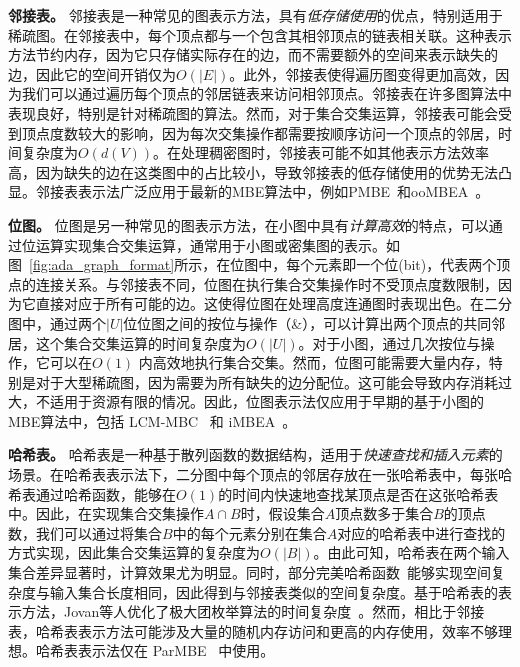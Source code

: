 \textbf{邻接表。} 邻接表是一种常见的图表示方法，具有\emph{低存储使用}的优点，特别适用于稀疏图。在邻接表中，每个顶点都与一个包含其相邻顶点的链表相关联。这种表示方法节约内存，因为它只存储实际存在的边，而不需要额外的空间来表示缺失的边，因此它的空间开销仅为$O(|E|)$。此外，邻接表使得遍历图变得更加高效，因为我们可以通过遍历每个顶点的邻居链表来访问相邻顶点。邻接表在许多图算法中表现良好，特别是针对稀疏图的算法。然而，对于集合交集运算，邻接表可能会受到顶点度数较大的影响，因为每次交集操作都需要按顺序访问一个顶点的邻居，时间复杂度为$O(d(V))$。在处理稠密图时，邻接表可能不如其他表示方法效率高，因为缺失的边在这类图中的占比较小，导致邻接表的低存储使用的优势无法凸显。邻接表表示法广泛应用于最新的MBE算法中，例如PMBE~\cite{PMBE20}和ooMBEA~\cite{ooMBE22}。

\textbf{位图。} 位图是另一种常见的图表示方法，在小图中具有\emph{计算高效}的特点，可以通过位运算实现集合交集运算，通常用于小图或密集图的表示。如图~\ref{fig:ada_graph_format}所示，在位图中，每个元素即一个位(bit)，代表两个顶点的连接关系。与邻接表不同，位图在执行集合交集操作时不受顶点度数限制，因为它直接对应于所有可能的边。这使得位图在处理高度连通图时表现出色。在二分图中，通过两个$|U|$位位图之间的按位与操作（\&），可以计算出两个顶点的共同邻居，这个集合交集运算的时间复杂度为$O(|U|)$。对于小图，通过几次按位与操作，它可以在$O(1)$ 内高效地执行集合交集。然而，位图可能需要大量内存，特别是对于大型稀疏图，因为需要为所有缺失的边分配位。这可能会导致内存消耗过大，不适用于资源有限的情况。因此，位图表示法仅应用于早期的基于小图的MBE算法中，包括 LCM-MBC~\cite{lcmmbc07} 和 iMBEA~\cite{iMBEA14}。

\textbf{哈希表。} 哈希表是一种基于散列函数的数据结构，适用于\emph{快速查找和插入元素}的场景。在哈希表表示法下，二分图中每个顶点的邻居存放在一张哈希表中，每张哈希表通过哈希函数，能够在$O(1)$的时间内快速地查找某顶点是否在这张哈希表中。因此，在实现集合交集操作$A \cap B$时，假设集合$A$顶点数多于集合$B$的顶点数，我们可以通过将集合$B$中的每个元素分别在集合$A$对应的哈希表中进行查找的方式实现，因此集合交集运算的复杂度为$O(|B|)$。由此可知，哈希表在两个输入集合差异显著时，计算效果尤为明显。同时，部分完美哈希函数~\cite{cuckoohash04,murmurhash}能够实现空间复杂度与输入集合长度相同，因此得到与邻接表类似的空间复杂度。基于哈希表的表示方法，Jovan等人优化了极大团枚举算法的时间复杂度~\cite{MCE20}。然而，相比于邻接表，哈希表表示方法可能涉及大量的随机内存访问和更高的内存使用，效率不够理想。哈希表表示法仅在 ParMBE~\cite{parMBE18} 中使用。



